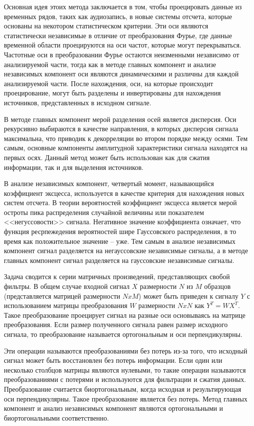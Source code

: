 Основная идея этоих метода заключается в том, чтобы проецировать данные из временных рядов, таких как аудиозапись, в новые системы отсчета, которые основаны на некотором статистическом критерии. Эти оси являются статистически независимые в отличие от преобразования Фурье, где данные временной области проецируются на оси частот, которые могут перекрываться. Частотные оси в преобразовании Фурье остаются неизменными независимо от анализируемой части, тогда как в методе главных компонент и анализе независимых компонент оси являются динамическими и различны для каждой анализируемой части. После нахождения, оси, на которые происходит проецирование, могут быть разделены и инвертированы для нахождения источников, представленных в исходном сигнале.

В методе главных компонент мерой разделения осей является дисперсия. Оси рекурсивно выбираются в качестве направления, в которых дисперсия сигнала максимальна, что приводик к декорреляции во втором порядке между осями. Тем самым, основные компоненты амплитудной характеристики сигнала находятся на первых осях. Данный метод может быть использован как для сжатия информации, так и для выделения источников.

В анализе независимых компонент, четвертый момент, называющийся коэффициент эксцесса, используется в качестве критерия для нахождения новых систем отсчета. В теории вероятностей коэффициент эксцесса является мерой остроты пика распределения случайной величины или показателем <<негуссовости>> сигнала. Негативное значение коэффициента означает, что функция ресрпежедения вероятностей шире Гауссовского распределения, в то время как положительное значение -- уже. Тем самым в анализе независимых компонент сигнал разделяется на негауссовские независимые сигналы, а в методе главных компонент сигнал разделяется на гауссовские независимые сигналы.

Задача сводится к серии матричных произведений, представляющих свобой фильтры. В общем случае входной сигнал $X$ размерности $N$ из $M$ образцов (представляется матрицей размерности $NxM$) может быть приведен к сигналу $Y$ с использованием матрицы преобразования $W$ размерности $NxN$ как $Y^T = WX^T$. Такое преобразование проецирует сигнал на разные оси основываясь на матрице преобразования. Если размер полученного сигнала равен размер исходного сигнала, то преобразование называется ортогональным и оси перпендикулярны.

Эти операции называются преобразованиями без потерь из-за того, что исходный сигнал может быть восстановлен без потерь информации. Если один или несколько столбцов матрицы являются нулевыми, то такие операции называются преобразованиями с потерями и используются для фильтрации и сжатия данных. Преобразование считается биортогональным, когда исходная и результирующая оси перпендикулярны. Такое преобразование является без потерь. Метод главных компонент и анализ независимых компонент являются ортогональными и биортогональными соответственно.


